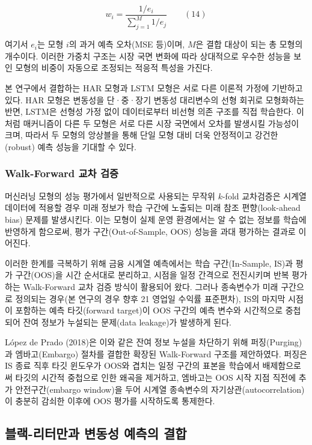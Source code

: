 \documentclass{article}
\begin{document}
\begin{equation}
w_i = \frac{1/e_i}{\sum_{j=1}^{M} 1/e_j} \qquad(14)\end{equation}

여기서 $e_i$는 모형 $i$의 과거 예측 오차(MSE 등)이며, $M$은 결합 대상이 되는 총 모형의 개수이다. 이러한 가중치 구조는 시장 국면 변화에 따라 상대적으로 우수한 성능을 보인 모형의 비중이 자동으로 조정되는 적응적 특성을 가진다.

본 연구에서 결합하는 HAR 모형과 LSTM 모형은 서로 다른 이론적 가정에 기반하고 있다. HAR 모형은 변동성을 단·중·장기 변동성 대리변수의 선형 회귀로 모형화하는 반면, LSTM은 선형성 가정 없이 데이터로부터 비선형 의존 구조를 직접 학습한다. 이처럼 매커니즘이 다른 두 모형은 서로 다른 시장 국면에서 오차를 발생시킬 가능성이 크며, 따라서 두 모형의 앙상블을 통해 단일 모형 대비 더욱 안정적이고 강건한(robust) 예측 성능을 기대할 수 있다.

\subsubsection{Walk-Forward 교차 검증}
\label{subsubsec:walk_forward_review}

머신러닝 모형의 성능 평가에서 일반적으로 사용되는 무작위 $k$-fold 교차검증은 시계열 데이터에 적용할 경우 미래 정보가 학습 구간에 노출되는 미래 참조 편향(look-ahead bias) 문제를 발생시킨다. 이는 모형이 실제 운영 환경에서는 알 수 없는 정보를 학습에 반영하게 함으로써, 평가 구간(Out-of-Sample, OOS) 성능을 과대 평가하는 결과로 이어진다.

이러한 한계를 극복하기 위해 금융 시계열 예측에서는 학습 구간(In-Sample, IS)과 평가 구간(OOS)을 시간 순서대로 분리하고, 시점을 일정 간격으로 전진시키며 반복 평가하는 Walk-Forward 교차 검증 방식이 활용되어 왔다. 그러나 종속변수가 미래 구간으로 정의되는 경우(본 연구의 경우 향후 21 영업일 수익률 표준편차), IS의 마지막 시점이 포함하는 예측 타깃(forward target)이 OOS 구간의 예측 변수와 시간적으로 중첩되어 잔여 정보가 누설되는 문제(data leakage)가 발생하게 된다.

López de Prado (2018)은 이와 같은 잔여 정보 누설을 차단하기 위해 퍼징(Purging)과 엠바고(Embargo) 절차를 결합한 확장된 Walk-Forward 구조를 제안하였다. 퍼징은 IS 종료 직후 타깃 윈도우가 OOS와 겹치는 일정 구간의 표본을 학습에서 배제함으로써 타깃의 시간적 중첩으로 인한 왜곡을 제거하고, 엠바고는 OOS 시작 지점 직전에 추가 안전구간(embargo window)을 두어 시계열 종속변수의 자기상관(autocorrelation)이 충분히 감쇠한 이후에 OOS 평가를 시작하도록 통제한다.

\subsection{블랙-리터만과 변동성 예측의 결합}
\label{subsec:bl_vol_review}
\end{document}
